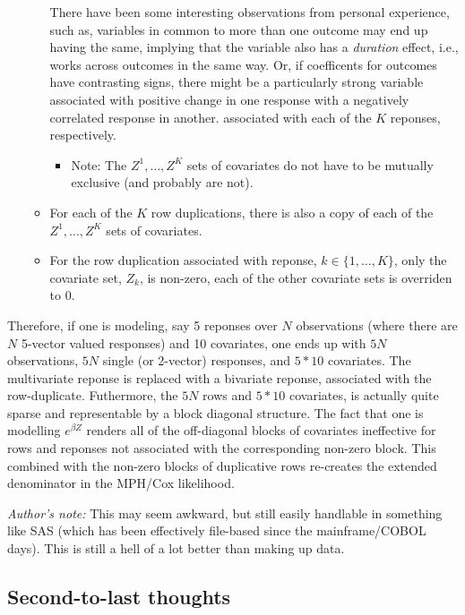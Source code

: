 \documentclass[10pt]{article}
\begin{document}
\begin{itemize}
\begin{itemize}
{                There have been some interesting observations from personal experience, such as, variables in
                common to more than one outcome may end up having the same, implying that the variable also has a {\em duration} effect, i.e., works across outcomes in the same
                way. Or, if coefficents for outcomes have contrasting signs, there might be a particularly strong variable associated with
                positive change in one response with a negatively correlated response in another.} associated with each of the
                $K$ reponses, respectively.
                \begin{itemize}
                    \item Note: The $Z^1, \ldots, Z^K$ sets of covariates do not have to be mutually exclusive (and probably are not).
                \end{itemize}
            \item For each of the $K$ row duplications, there is also a copy of each of the $Z^1, \ldots, Z^K$ sets of covariates.
            \item For the row duplication associated with reponse, $k \in \{1, \ldots, K\}$, only the covariate set, $Z_k$, is non-zero,
                each of the other covariate sets is overriden to 0.
        \end{itemize}
\end{itemize}

Therefore, if one is modeling, say 5 reponses over $N$ observations (where there are $N$ 5-vector valued responses) and 10 covariates, one
ends up with $5N$ observations, $5N$ single (or 2-vector) responses, and $5*10$ covariates.  The multivariate reponse
is replaced with a bivariate reponse, associated with the row-duplicate.  Futhermore, the $5N$ rows and $5*10$ covariates, is actually quite
sparse and representable by a block diagonal structure.   The fact that one is modelling $e^{\beta Z}$ renders all of the off-diagonal 
blocks of covariates ineffective for rows and reponses not associated with the corresponding non-zero block.  This combined with 
the non-zero blocks of duplicative rows re-creates the extended denominator in the MPH/Cox likelihood.

{\em Author's note:} This may seem awkward, but still easily handlable in something like SAS (which has been effectively file-based since
the mainframe/COBOL days).  This is still a hell of a lot better than making up data. 

\subsection{Second-to-last thoughts}
\end{document}
